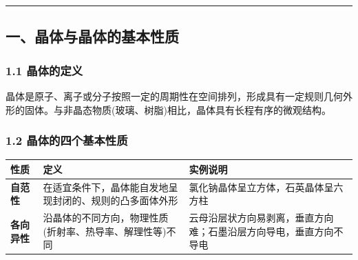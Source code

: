 \documentclass[a4paper,11pt]{ctexart}
\newcounter{none}
\newcommand{\箭}{\ensuremath{\rightarrow}}
\newcommand{\左箭}{\ensuremath{\leftarrow}}
\newcommand{\上箭}{\ensuremath{\uparrow}}
\newcommand{\下箭}{\ensuremath{\downarrow}}
\newcommand{\衡}{\ensuremath{\rightleftharpoons}}
\newcommand{\双箭}{\ensuremath{\leftrightarrow}}
\newcommand{\约等于}{\ensuremath{\approx}}
\newcommand{\小于等于}{\ensuremath{\leq}}
\newcommand{\大于等于}{\ensuremath{\geq}}
\newcommand{\不等于}{\ensuremath{\neq}}
\newcommand{\西格马}{\ensuremath{\sigma}}
\newcommand{\派}{\ensuremath{\pi}}
\begin{document}
\begin{center}\rule{0.5\linewidth}{0.5pt}\end{center}

\subsection{一、晶体与晶体的基本性质}\label{ux4e00ux6676ux4f53ux4e0eux6676ux4f53ux7684ux57faux672cux6027ux8d28}

\subsubsection{1.1 晶体的定义}\label{ux6676ux4f53ux7684ux5b9aux4e49}

晶体是原子、离子或分子按照一定的周期性在空间排列，形成具有一定规则几何外形的固体。与非晶态物质(玻璃、树脂)相比，晶体具有长程有序的微观结构。

\subsubsection{1.2 晶体的四个基本性质}\label{ux6676ux4f53ux7684ux56dbux4e2aux57faux672cux6027ux8d28}

{\def\LTcaptype{none} %
\begin{longtable}[]{@{}
  >{\raggedright\arraybackslash}p{}
  >{\raggedright\arraybackslash}p{}
  >{\raggedright\arraybackslash}p{}@{}}
\toprule\noalign{}
\begin{minipage}[b]{\linewidth}\raggedright
性质
\end{minipage} & \begin{minipage}[b]{\linewidth}\raggedright
定义
\end{minipage} & \begin{minipage}[b]{\linewidth}\raggedright
实例说明
\end{minipage} \\
\midrule\noalign{}
\endhead
\bottomrule\noalign{}
\endlastfoot
\textbf{自范性} & 在适宜条件下，晶体能自发地呈现封闭的、规则的凸多面体外形 & 氯化钠晶体呈立方体，石英晶体呈六方柱 \\
\textbf{各向异性} & 沿晶体的不同方向，物理性质(折射率、热导率、解理性等)不同 & 云母沿层状方向易剥离，垂直方向难；石墨沿层方向导电，垂直方向不导电 \\
\end{longtable}
}
\end{document}
